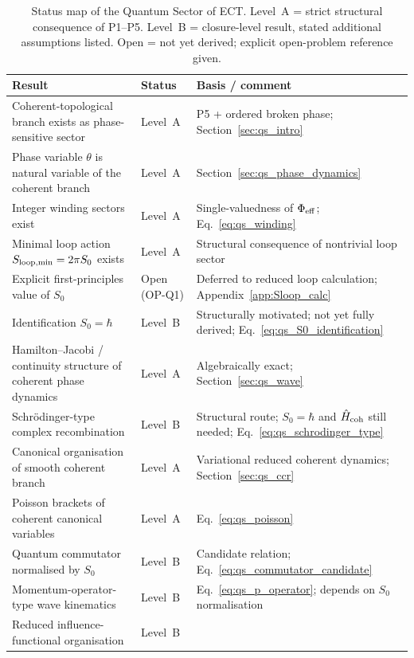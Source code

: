 \begin{table}[h]
\caption{Status map of the Quantum Sector of ECT.
Level~A = strict structural consequence of P1--P5.
Level~B = closure-level result, stated additional assumptions
listed.
Open = not yet derived; explicit open-problem reference given.}
\label{tab:qs_status}
\centering\small
\renewcommand{\arraystretch}{1.35}
\begin{tabular}{p{6.0cm}p{2.4cm}p{4.5cm}}
\hline\hline
Result & Status & Basis / comment \\
\hline
Coherent-topological branch exists as phase-sensitive sector
  & Level~A
  & P5 + ordered broken phase; Section~\ref{sec:qs_intro} \\
Phase variable $\theta$ is natural variable of the coherent branch
  & Level~A
  & Section~\ref{sec:qs_phase_dynamics} \\
Integer winding sectors exist
  & Level~A
  & Single-valuedness of $\Phi_{\rm eff}$;
    Eq.~\eqref{eq:qs_winding} \\
Minimal loop action $S_{\rm loop,min}=2\pi S_0$ exists
  & Level~A
  & Structural consequence of nontrivial loop sector \\
Explicit first-principles value of $S_0$
  & Open (OP-Q1)
  & Deferred to reduced loop calculation;
    Appendix~\ref{app:Sloop_calc} \\
Identification $S_0=\hbar$
  & Level~B
  & Structurally motivated; not yet fully derived;
    Eq.~\eqref{eq:qs_S0_identification} \\
Hamilton--Jacobi / continuity structure of coherent phase dynamics
  & Level~A
  & Algebraically exact; Section~\ref{sec:qs_wave} \\
Schr\"odinger-type complex recombination
  & Level~B
  & Structural route; $S_0=\hbar$ and $\hat H_{\rm coh}$ still needed;
    Eq.~\eqref{eq:qs_schrodinger_type} \\
Canonical organisation of smooth coherent branch
  & Level~A
  & Variational reduced coherent dynamics;
    Section~\ref{sec:qs_ccr} \\
Poisson brackets of coherent canonical variables
  & Level~A
  & Eq.~\eqref{eq:qs_poisson} \\
Quantum commutator normalised by $S_0$
  & Level~B
  & Candidate relation; Eq.~\eqref{eq:qs_commutator_candidate} \\
Momentum-operator-type wave kinematics
  & Level~B
  & Eq.~\eqref{eq:qs_p_operator}; depends on $S_0$ normalisation \\
Reduced influence-functional organisation
  & Level~B

\end{tabular}
\end{table}

